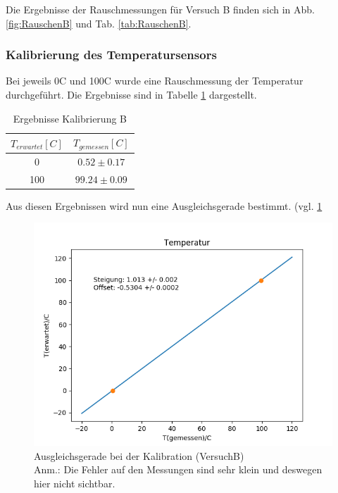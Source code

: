 \documentclass[12pt,a4paper]{article}
\begin{document}
Die Ergebnisse der Rauschmessungen für Versuch B finden sich in Abb. \ref{fig:RauschenB} und Tab. \ref{tab:RauschenB}.



\subsubsection{Kalibrierung des Temperatursensors}
Bei jeweils 0C und 100C wurde eine Rauschmessung der Temperatur durchgeführt. Die Ergebnisse sind in Tabelle \ref{tab:KaliB} dargestellt.

\begin{table}
\begin{center}
\begin{tabular}{|c|c|}
\hline 
$T_{erwartet}[C]$ & $T_{gemessen}[C]$ \\ 
\hline 
0 & $0.52 \pm 0.17$ \\ 
\hline 
100 & $99.24\pm 0.09$ \\ 
\hline 
\end{tabular}
\caption[Ergebnisse Kalibrierung B]{Ergebnisse Kalibrierung B}
\label{tab:KaliB}
\end{center}
\end{table}

Aus diesen Ergebnissen wird nun eine Ausgleichsgerade bestimmt. (vgl. \ref{fig:GeradeKaliB}

\begin{figure}
\includegraphics[width=\linewidth]{Bilder/KalibrationB}
\begin{center}
\caption[KalibrationB]{Ausgleichsgerade bei der Kalibration (VersuchB)\\
Anm.: Die Fehler auf den Messungen sind sehr klein und deswegen hier nicht sichtbar.}
\label{fig:GeradeKaliB}
\end{center}
\end{figure}
\end{document}
